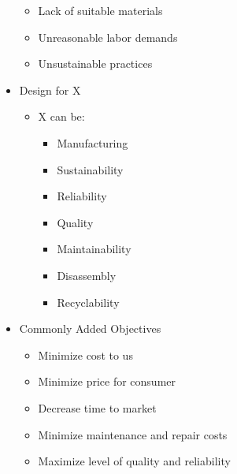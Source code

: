 \begin{itemize}
\begin{itemize}
      \item Lack of suitable materials

      \item Unreasonable labor demands

      \item Unsustainable practices

    \end{itemize}

  \item Design for X

    \begin{itemize}

      \item X can be:

        \begin{itemize}

          \item Manufacturing

          \item Sustainability

          \item Reliability

          \item Quality

          \item Maintainability

          \item Disassembly

          \item Recyclability

        \end{itemize}

    \end{itemize}

  \item Commonly Added Objectives

    \begin{itemize}

      \item Minimize cost to us

      \item Minimize price for consumer

      \item Decrease time to market

      \item Minimize maintenance and repair costs

      \item Maximize level of quality and reliability


\end{itemize}
\end{itemize}
